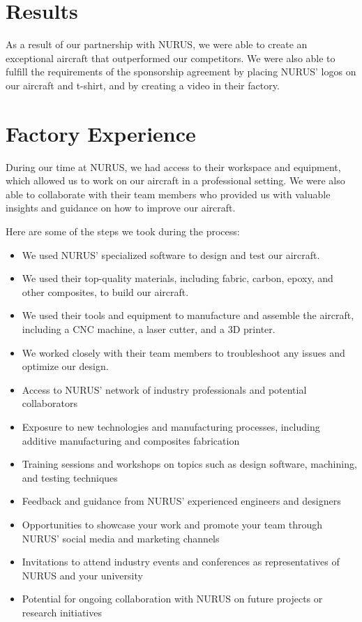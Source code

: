 \documentclass{article}
\begin{document}
\section{Results}

As a result of our partnership with NURUS, we were able to create an exceptional aircraft that outperformed our competitors. We were also able to fulfill the requirements of the sponsorship agreement by placing NURUS' logos on our aircraft and t-shirt, and by creating a video in their factory.

\section{Factory Experience}

During our time at NURUS, we had access to their workspace and equipment, which allowed us to work on our aircraft in a professional setting. We were also able to collaborate with their team members who provided us with valuable insights and guidance on how to improve our aircraft.

Here are some of the steps we took during the process:

\begin{itemize}
    \item We used NURUS' specialized software to design and test our aircraft.
    \item We used their top-quality materials, including fabric, carbon, epoxy, and other composites, to build our aircraft.
    \item We used their tools and equipment to manufacture and assemble the aircraft, including a CNC machine, a laser cutter, and a 3D printer.
    \item We worked closely with their team members to troubleshoot any issues and optimize our design.  
	\item Access to NURUS' network of industry professionals and potential collaborators
	\item Exposure to new technologies and manufacturing processes, including additive manufacturing and composites fabrication
	\item Training sessions and workshops on topics such as design software, machining, and testing techniques
	\item Feedback and guidance from NURUS' experienced engineers and designers
	\item Opportunities to showcase your work and promote your team through NURUS' social media and marketing channels
	\item Invitations to attend industry events and conferences as representatives of NURUS and your university
	\item Potential for ongoing collaboration with NURUS on future projects or research initiatives
\end{itemize}
\end{document}
